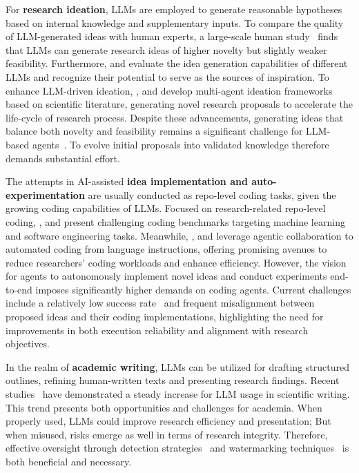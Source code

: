 \documentclass{article} %
\begin{document}
For \textbf{research ideation}, LLMs are employed to generate reasonable hypotheses~\citep{wang2023hypothesis, qi2023large, zhou2024hypothesis} based on internal knowledge and supplementary inputs. To compare the quality of LLM-generated ideas with human experts, a large-scale human study~\citep{si2024can} finds that LLMs can generate research ideas of higher novelty but slightly weaker feasibility. Furthermore, \citet{kumar2024can} and \citet{girotra2023ideas} evaluate the idea generation capabilities of different LLMs and recognize their potential to serve as the sources of inspiration. To enhance LLM-driven ideation, \citet{baek2024researchagentiterativeresearchidea}, \citet{nigam2024acceleron} and \citet{nigam2024interactive} develop multi-agent ideation frameworks based on scientific literature, generating novel research proposals to accelerate the life-cycle of research process. Despite these advancements, generating ideas that balance both novelty and feasibility remains a significant challenge for LLM-based agents~\citep{si2024can}. To evolve initial proposals into validated knowledge therefore demands substantial effort.

The attempts in AI-assisted \textbf{idea implementation and auto-experimentation} are usually conducted as repo-level coding tasks, given the growing coding capabilities of LLMs. Focused on research-related repo-level coding, \citet{jimenez2024swebench}, \citet{liu2023ml} and \citet{chan2024mle} present challenging coding benchmarks targeting machine learning and software engineering tasks. Meanwhile, \citet{yang2024swe}, \citet{wang2024opendevin} and \cite{tao2024magis} leverage agentic collaboration to automated coding from language instructions, offering promising avenues to reduce researchers' coding workloads and enhance efficiency. However, the vision for agents to autonomously implement novel ideas and conduct experiments end-to-end imposes significantly higher demands on coding agents. Current challenges include a relatively low success rate~\citep{lu2024aiscientist} and frequent misalignment between proposed ideas and their coding implementations, highlighting the need for improvements in both execution reliability and alignment with research objectives.

 In the realm of \textbf{academic writing}, LLMs can be utilized for drafting structured outlines, refining human-written texts and presenting research findings. Recent studies~\citep{liang2024mapping, geng2024chatgpt} have demonstrated a steady increase for LLM usage in scientific writing. This trend presents both opportunities and challenges for academia. When properly used, LLMs could improve research efficiency and presentation; But when misused, risks emerge as well in terms of research integrity. Therefore, effective oversight through detection strategies~\citep{liang2024monitoring, yang2023survey, ghosal2023towards} and watermarking techniques~\citep{kirchenbauer2023watermark, zhao2023protecting, zhang2024remark} is both beneficial and necessary.
\end{document}
